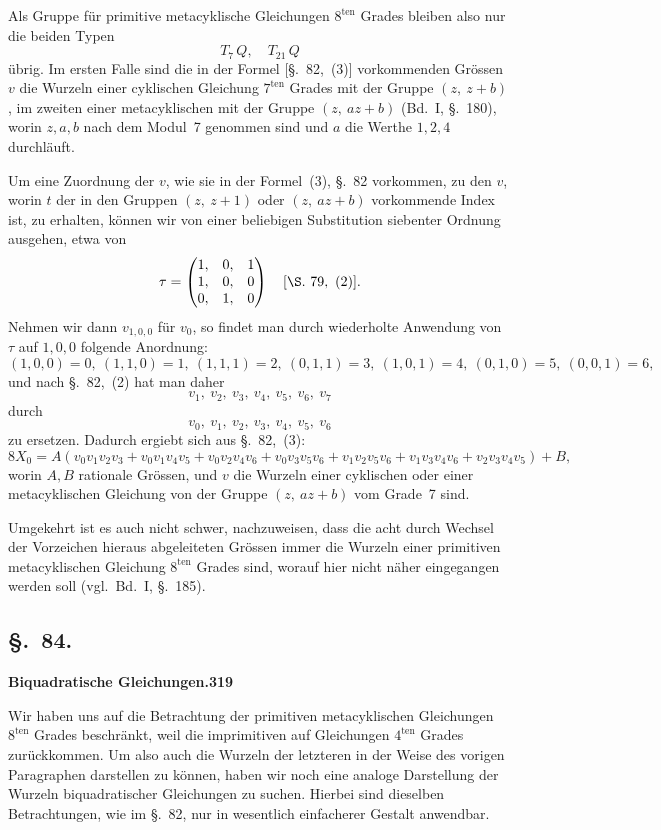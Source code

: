 \documentclass[12pt,a4paper]{article}
\begin{document}
Als Gruppe f\"ur primitive metacyklische Gleichungen $8^{\text{ten}}$ Grades bleiben also nur die beiden Typen
\[
T_7\,Q,\quad T_{21}\,Q
\]
\"ubrig. Im ersten Falle sind die in der Formel [\S.~82,~(3)] vorkommenden Gr\"ossen $v$ die Wurzeln einer cyklischen Gleichung $7^{\text{ten}}$ Grades mit der Gruppe $(z,\ z+b)$, im zweiten einer metacyklischen mit der Gruppe $(z,\ az+b)$ (Bd.~I, \S.~180), worin $z,a,b$ nach dem Modul~7 genommen sind und $a$ die Werthe $1,2,4$ durchl\"auft.

Um eine Zuordnung der $v$, wie sie in der Formel~(3), \S.~82 vorkommen, zu den $v$, worin $t$ der in den Gruppen $(z,\ z+1)$ oder $(z,\ az+b)$ vorkommende Index ist, zu erhalten, k\"onnen wir von einer beliebigen Substitution siebenter Ordnung ausgehen, etwa von
\[
\tau =
\begin{pmatrix} 1,& 0,& 1\\ 1,& 0,& 0\\ 0,& 1,& 0\end{pmatrix}
\quad [\S.\ 79,\ (2)].
\]
Nehmen wir dann $v_{1,0,0}$ f\"ur $v_0$, so findet man durch wiederholte Anwendung von $\tau$ auf $1,0,0$ folgende Anordnung:
\[
(1,0,0)=0,\ (1,1,0)=1,\ (1,1,1)=2,\ (0,1,1)=3,\ (1,0,1)=4,\ (0,1,0)=5,\ (0,0,1)=6,
\]
und nach \S.~82,~(2) hat man daher
\[
v_1,\ v_2,\ v_3,\ v_4,\ v_5,\ v_6,\ v_7
\]
durch
\[
v_0,\ v_1,\ v_2,\ v_3,\ v_4,\ v_5,\ v_6
\]
zu ersetzen. Dadurch ergiebt sich aus \S.~82,~(3):
\[
8X_0 = A(v_0v_1v_2v_3 + v_0v_1v_4v_5 + v_0v_2v_4v_6 + v_0v_3v_5v_6 + v_1v_2v_5v_6 + v_1v_3v_4v_6 + v_2v_3v_4v_5) + B,
\]
worin $A,B$ rationale Gr\"ossen, und $v$ die Wurzeln einer cyklischen oder einer metacyklischen Gleichung von der Gruppe $(z,\ az+b)$ vom Grade~7 sind.

Umgekehrt ist es auch nicht schwer, nachzuweisen, dass die acht durch Wechsel der Vorzeichen hieraus abgeleiteten Gr\"ossen immer die Wurzeln einer primitiven metacyklischen Gleichung $8^{\text{ten}}$ Grades sind, worauf hier nicht n\"aher eingegangen werden soll (vgl.\ Bd.~I, \S.~185).

\subsection*{\S.~84.}
\textbf{Biquadratische Gleichungen.}\hfill\textbf{319}\\[4pt]

Wir haben uns auf die Betrachtung der primitiven metacyklischen Gleichungen $8^{\text{ten}}$ Grades beschr\"ankt, weil die imprimitiven auf Gleichungen $4^{\text{ten}}$ Grades zur\"uckkommen. Um also auch die Wurzeln der letzteren in der Weise des vorigen Paragraphen darstellen zu k\"onnen, haben wir noch eine analoge Darstellung der Wurzeln biquadratischer Gleichungen zu suchen. Hierbei sind dieselben Betrachtungen, wie im \S.~82, nur in wesentlich einfacherer Gestalt anwendbar.
\end{document}
